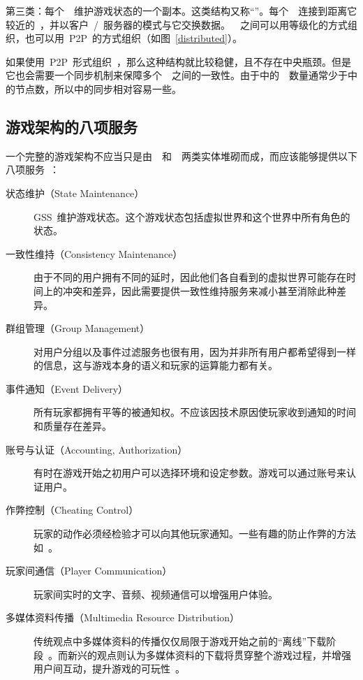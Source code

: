 第三类：每个~\gss~维护游戏状态的一个副本。这类结构又称“{\ma}”。每个~\ioc~连接到距离它较近的~\gss，并以客户~\slash~服务器的模式与它交换数据。~\gss~之间可以用等级化的方式组织，也可以用~P2P~的方式组织（如图~\ref{distributed}）。

如果使用~P2P~形式组织~\gss，那么这种结构就比较稳健，且不存在中央瓶颈。但是它也会需要一个同步机制来保障多个~\gss~之间的一致性。由于{\ma}中的~\gss~数量通常少于{\pa}中的节点数，所以{\ma}中的同步相对容易一些。





\subsection{游戏架构的八项服务}
\label{service}

一个完整的游戏架构不应当只是由~\ioc~和~\gss~两类实体堆砌而成，而应该能够提供以下八项服务~\cite{openping, dsl}：

\begin{description}
\item[状态维护（State Maintenance）]
GSS~维护游戏状态。这个游戏状态包括虚拟世界和这个世界中所有角色的状态。

\item[一致性维持（Consistency Maintenance）]
由于不同的用户拥有不同的延时，因此他们各自看到的虚拟世界可能存在时间上的冲突和差异，因此需要提供一致性维持服务来减小甚至消除此种差异。

\item[群组管理（Group Management）]
对用户分组以及事件过滤服务也很有用，因为并非所有用户都希望得到一样的信息，这与游戏本身的语义和玩家的运算能力都有关。

\item[事件通知（Event Delivery）]
所有玩家都拥有平等的被通知权。不应该因技术原因使玩家收到通知的时间和质量存在差异。

\item[账号与认证（Accounting, Authorization）]
有时在游戏开始之初用户可以选择环境和设定参数。游戏可以通过账号来认证用户。

\item[作弊控制（Cheating Control）]
玩家的动作必须经检验才可以向其他玩家通知。一些有趣的防止作弊的方法如~\cite{cheat1, cheat2, cheat3, cheat4}。

\item[玩家间通信（Player Communication）]
玩家间实时的文字、音频、视频通信可以增强用户体验。

\item[多媒体资料传播（Multimedia Resource Distribution）]
传统观点中多媒体资料的传播仅仅局限于游戏开始之前的“离线”下载阶段~\cite{traditional}。而新兴的观点则认为多媒体资料的下载将贯穿整个游戏过程，并增强用户间互动，提升游戏的可玩性~\cite{modern1, modern2, modern3}。
\end{description}

